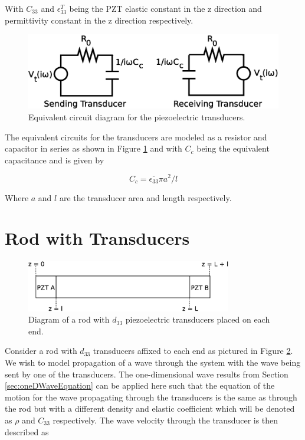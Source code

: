 With $C_{33}$ and $\epsilon ^T_{33}$ being the PZT elastic constant in the z direction and permittivity constant in the z direction respectively.

\begin{figure}[ht!]
\centering
\includegraphics[width=1\textwidth]{eps_pics/trans_circ}
\caption{Equivalent circuit diagram for the piezoelectric transducers.
	 \label{fig:trans_circ}} 
\end{figure}


The equivalent circuits for the transducers are modeled as a resistor and capacitor in series as shown in Figure \ref{fig:trans_circ} and with $C_c$ being the equivalent capacitance and is given by

\begin{equation}
C_c = \overline{\epsilon_{33}} \pi a^2/l
\end{equation}

Where $a$ and $l$ are the transducer area and length respectively. 

\section{Rod with Transducers}
\label{sec:rodWithTrans}

\begin{figure}[ht!]
\centering
\includegraphics[width=0.8\textwidth]{eps_pics/rodTrans.eps}
\caption{Diagram of a rod with $d_{33}$ piezoelectric transducers placed on each end.
	 \label{fig:rodTrans}} 
\end{figure}

Consider a rod with $d_{33}$ transducers affixed to each end as pictured in Figure \ref{fig:rodTrans}. We wish to model propagation of a wave through the system with the wave being sent by one of the transducers. The one-dimensional wave results from Section \ref{sec:oneDWaveEquation} can be applied here such that the equation of the motion for the wave propagating through the transducers is the same as through the rod but with a different density and elastic coefficient which will be denoted as $\rho$ and $C_{33}$ respectively. The wave velocity through the transducer is then described as

